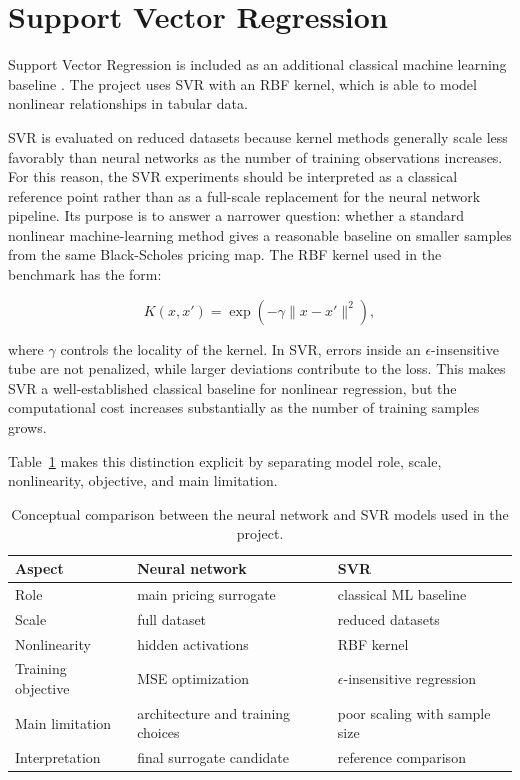 \section{Support Vector Regression}

Support Vector Regression is included as an additional classical machine learning baseline \cite{smola2004tutorial}.
The project uses SVR with an RBF kernel, which is able to model nonlinear relationships in tabular data.

SVR is evaluated on reduced datasets because kernel methods generally scale less favorably than neural networks as the number of training observations increases.
For this reason, the SVR experiments should be interpreted as a classical reference point rather than as a full-scale replacement for the neural network pipeline.
Its purpose is to answer a narrower question: whether a standard nonlinear machine-learning method gives a reasonable baseline on smaller samples from the same Black-Scholes pricing map.
The RBF kernel used in the benchmark has the form:

\begin{equation}
    K(x, x')
    =
    \exp\left(-\gamma \lVert x - x' \rVert^2\right),
\end{equation}

where $\gamma$ controls the locality of the kernel.
In SVR, errors inside an $\epsilon$-insensitive tube are not penalized, while larger deviations contribute to the loss.
This makes SVR a well-established classical baseline for nonlinear regression, but the computational cost increases substantially as the number of training samples grows.

Table~\ref{tab:ml-model-comparison} makes this distinction explicit by separating model role, scale, nonlinearity, objective, and main limitation.

\begin{table}[H]
    \centering
    \begin{tabular}{lll}
        \toprule
        Aspect & Neural network & SVR \\
        \midrule
        Role & main pricing surrogate & classical ML baseline \\
        Scale & full dataset & reduced datasets \\
        Nonlinearity & hidden activations & RBF kernel \\
        Training objective & MSE optimization & $\epsilon$-insensitive regression \\
        Main limitation & architecture and training choices & poor scaling with sample size \\
        Interpretation & final surrogate candidate & reference comparison \\
        \bottomrule
    \end{tabular}
    \caption{Conceptual comparison between the neural network and SVR models used in the project.}
    \label{tab:ml-model-comparison}
\end{table}

